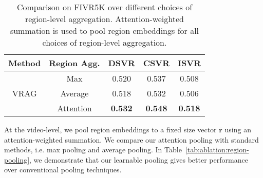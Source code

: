 \documentclass[letterpaper]{article} \usepackage{aaai22}  \usepackage{times}  \usepackage{helvet}  \usepackage{courier}  \usepackage[hyphens]{url}  \usepackage{graphicx} \urlstyle{rm} \usepackage{amsmath}
\begin{document}
\begin{table}[ht]
    \centering
    \begin{tabular}{|c|c|c|c|c|}
    \hline
         Method & Region Agg. & DSVR & CSVR & ISVR \\
         \hline\hline
\multirow{3}{*}{VRAG} & Max & 0.520 & 0.537 & 0.508 \\
         \cline{2-5}
         &  Average & 0.518 & 0.532 & 0.506 \\
         \cline{2-5}
          &  Attention & \textbf{0.532} & \textbf{0.548} & \textbf{0.518} \\
         \hline
    \end{tabular}
    \caption{Comparison on FIVR5K over different choices of region-level aggregation. Attention-weighted summation is used to pool region embeddings for all choices of region-level aggregation.}
    \label{tab:ablation:region-aggregation}
\end{table}

At the video-level, we pool region embeddings to a fixed size vector $\bar{\mathbf{r}}$ using an attention-weighted summation. We compare our attention pooling with standard methods, i.e. max pooling and average pooling. In Table~\ref{tab:ablation:region-pooling}, we demonstrate that our learnable pooling gives better performance over conventional pooling techniques.  
\end{document}
